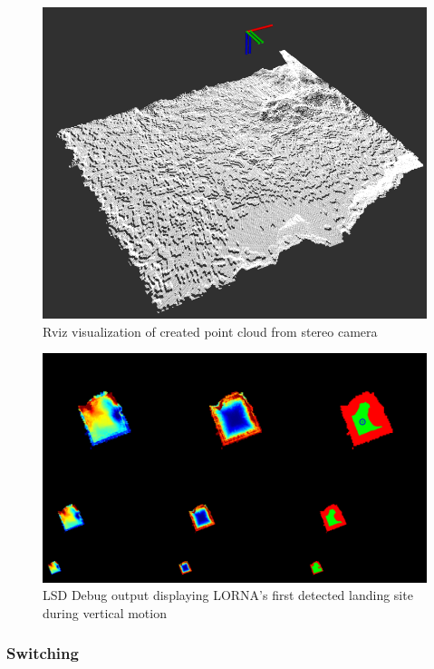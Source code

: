 \begin{figure}
    \centering
    \includegraphics[scale=0.45]{images/preparation/stereo/stereo_pointcloud.png}
    \caption{Rviz visualization of created point cloud from stereo camera}
\end{figure}
\clearpage %

\begin{figure}
    \centering
    \includegraphics[scale=0.25]{images/preparation/stereo/lsd_ascent.png}
    \caption{LSD Debug output displaying LORNA's first detected landing site during vertical motion}
\end{figure}

\subsubsection{Switching}

